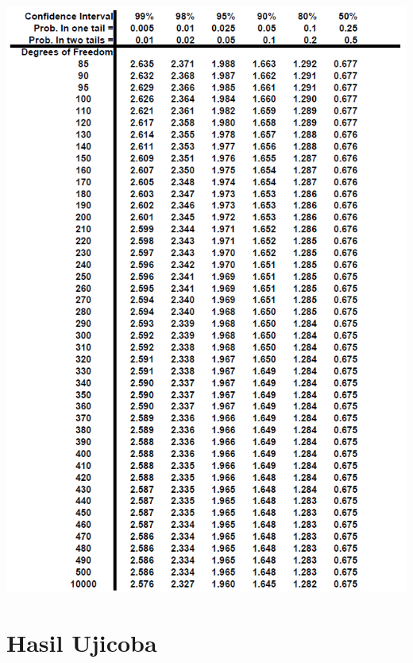 \begin{center}
\includegraphics[width=1\textwidth]{pics/tdist-2.png}
\end{center}
\clearpage
   
\chapter*{Hasil Ujicoba}
